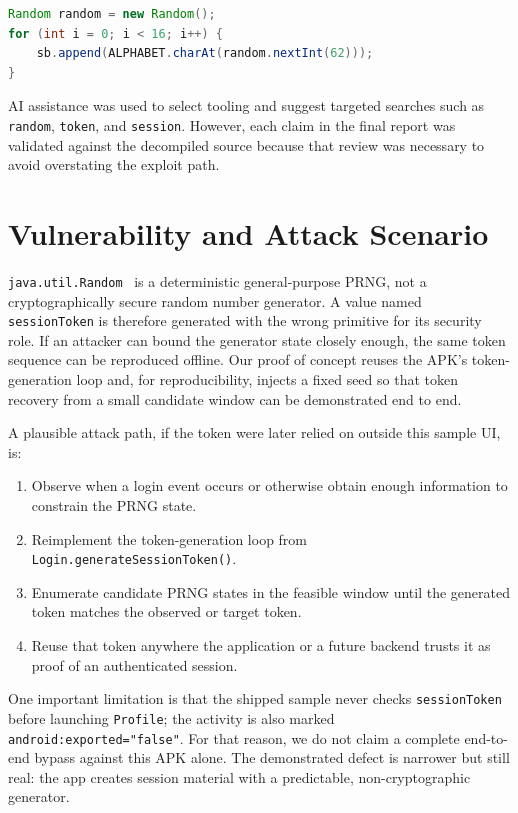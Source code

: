 \documentclass[letterpaper,twocolumn,10pt]{article}
\begin{document}
\begin{lstlisting}[language=Java,caption={Excerpt from the decompiled \texttt{Login} class showing \texttt{Random}-based token generation.}]
Random random = new Random();
for (int i = 0; i < 16; i++) {
    sb.append(ALPHABET.charAt(random.nextInt(62)));
}
\end{lstlisting}

AI assistance was used to select tooling and suggest targeted searches such as \texttt{random}, \texttt{token}, and \texttt{session}. However, each claim in the final report was validated against the decompiled source because that review was necessary to avoid overstating the exploit path.

\section{Vulnerability and Attack Scenario}
\texttt{java.util.Random}~\cite{randomdoc} is a deterministic general-purpose PRNG, not a cryptographically secure random number generator. A value named \texttt{sessionToken} is therefore generated with the wrong primitive for its security role. If an attacker can bound the generator state closely enough, the same token sequence can be reproduced offline. Our proof of concept reuses the APK's token-generation loop and, for reproducibility, injects a fixed seed so that token recovery from a small candidate window can be demonstrated end to end.

A plausible attack path, if the token were later relied on outside this sample UI, is:
\begin{enumerate}
\item Observe when a login event occurs or otherwise obtain enough information to constrain the PRNG state.
\item Reimplement the token-generation loop from \texttt{Login.generateSessionToken()}.
\item Enumerate candidate PRNG states in the feasible window until the generated token matches the observed or target token.
\item Reuse that token anywhere the application or a future backend trusts it as proof of an authenticated session.
\end{enumerate}

One important limitation is that the shipped sample never checks \texttt{sessionToken} before launching \texttt{Profile}; the activity is also marked \texttt{android:exported="false"}. For that reason, we do not claim a complete end-to-end bypass against this APK alone. The demonstrated defect is narrower but still real: the app creates session material with a predictable, non-cryptographic generator.
\end{document}
